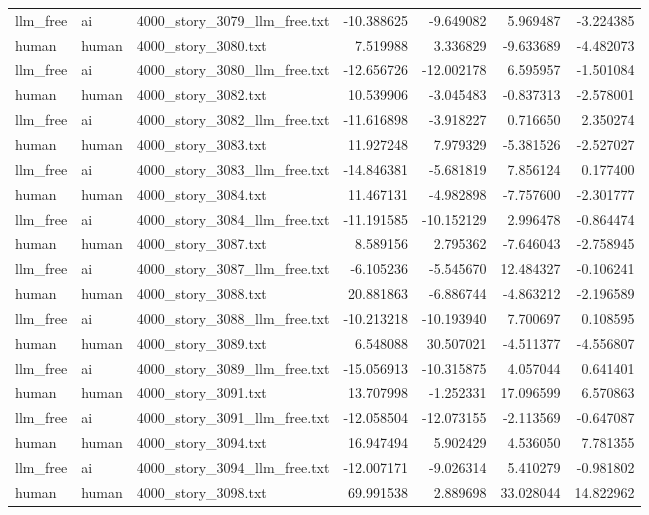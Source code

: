 \begin{longtable}{lllrrrr}
llm\_free & ai & 4000\_story\_3079\_llm\_free.txt & -10.388625 & -9.649082 & 5.969487 & -3.224385 \\
human & human & 4000\_story\_3080.txt & 7.519988 & 3.336829 & -9.633689 & -4.482073 \\
llm\_free & ai & 4000\_story\_3080\_llm\_free.txt & -12.656726 & -12.002178 & 6.595957 & -1.501084 \\
human & human & 4000\_story\_3082.txt & 10.539906 & -3.045483 & -0.837313 & -2.578001 \\
llm\_free & ai & 4000\_story\_3082\_llm\_free.txt & -11.616898 & -3.918227 & 0.716650 & 2.350274 \\
human & human & 4000\_story\_3083.txt & 11.927248 & 7.979329 & -5.381526 & -2.527027 \\
llm\_free & ai & 4000\_story\_3083\_llm\_free.txt & -14.846381 & -5.681819 & 7.856124 & 0.177400 \\
human & human & 4000\_story\_3084.txt & 11.467131 & -4.982898 & -7.757600 & -2.301777 \\
llm\_free & ai & 4000\_story\_3084\_llm\_free.txt & -11.191585 & -10.152129 & 2.996478 & -0.864474 \\
human & human & 4000\_story\_3087.txt & 8.589156 & 2.795362 & -7.646043 & -2.758945 \\
llm\_free & ai & 4000\_story\_3087\_llm\_free.txt & -6.105236 & -5.545670 & 12.484327 & -0.106241 \\
human & human & 4000\_story\_3088.txt & 20.881863 & -6.886744 & -4.863212 & -2.196589 \\
llm\_free & ai & 4000\_story\_3088\_llm\_free.txt & -10.213218 & -10.193940 & 7.700697 & 0.108595 \\
human & human & 4000\_story\_3089.txt & 6.548088 & 30.507021 & -4.511377 & -4.556807 \\
llm\_free & ai & 4000\_story\_3089\_llm\_free.txt & -15.056913 & -10.315875 & 4.057044 & 0.641401 \\
human & human & 4000\_story\_3091.txt & 13.707998 & -1.252331 & 17.096599 & 6.570863 \\
llm\_free & ai & 4000\_story\_3091\_llm\_free.txt & -12.058504 & -12.073155 & -2.113569 & -0.647087 \\
human & human & 4000\_story\_3094.txt & 16.947494 & 5.902429 & 4.536050 & 7.781355 \\
llm\_free & ai & 4000\_story\_3094\_llm\_free.txt & -12.007171 & -9.026314 & 5.410279 & -0.981802 \\
human & human & 4000\_story\_3098.txt & 69.991538 & 2.889698 & 33.028044 & 14.822962 \\

\end{longtable}
